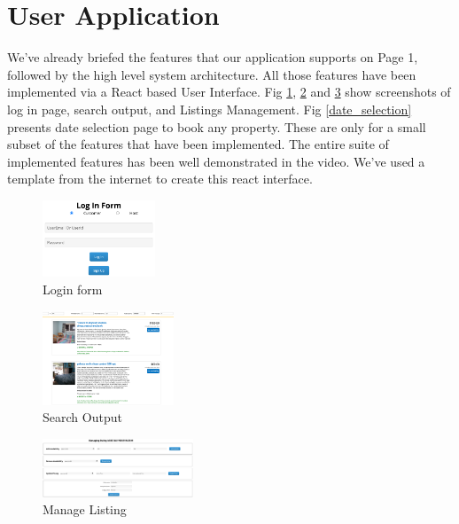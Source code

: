 \documentclass[conference]{IEEEtran}
\begin{document}
\section{\textbf{User Application}}\label{sec_userApplication}
    {We’ve already briefed the features that our application supports on Page 1, followed by the high level system architecture. All those features have been implemented via a React based User Interface. Fig \ref{login_form}, \ref{search_output} and \ref{manage_listing} show screenshots of log in page, search output, and Listings Management. Fig \ref{date_selection} presents date selection page to book any property. These are only for a small subset of the features that have been implemented. The entire suite of implemented features has been well demonstrated in the video. We've used a template from the internet to create this react interface.

    \begin{figure}[!h]
        \centering
        \includegraphics[width=0.3\textwidth]{../Directly_As_Images/loginform.png}
        \caption{Login form} \label{login_form}
    \end{figure}

    \begin{figure}[!h]
        \includegraphics[width=0.35\textwidth]{../Directly_As_Images/search_output.png}
        \caption{Search Output} \label{search_output}
    \end{figure}

    \begin{figure}[!h]
        \includegraphics[width=0.4\textwidth]{../Directly_As_Images/manage_listing_host.png}
        \caption{Manage Listing} \label{manage_listing}
    \end{figure}

}
\end{document}
